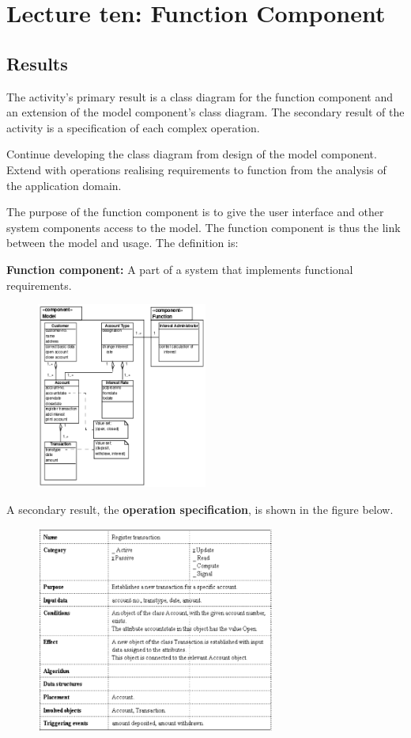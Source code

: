 \chapter{Lecture ten: Function Component}
\section{Results}
The activity's primary result is a class diagram for the function component and an extension of the model component's class diagram. The secondary result of the activity is a specification of each complex operation.

Continue developing the class diagram from design of the model component.
Extend with operations realising requirements to function from the analysis of the application domain.

The purpose of the function component is to give the user interface and other system components access to the model. The function component is thus the link between the model and usage. The definition is:
\begin{center}
    \textbf{Function component:} A part of a system that implements functional requirements.
\end{center}
\begin{figure}[H]
    \centering
    \includegraphics[width=0.5\textwidth]{figures/functioncomponentresults.png}
\end{figure}

A secondary result, the \textbf{operation specification}, is shown in the figure below.
\begin{figure}[H]
    \centering
    \includegraphics[width=0.7\textwidth]{figures/functioncomponentresults2.png}
\end{figure}

